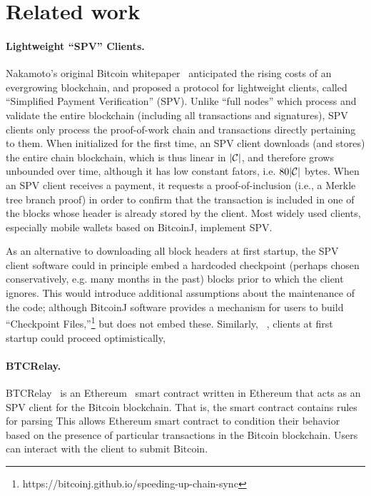 \section{Related work}

\paragraph{Lightweight ``SPV'' Clients.}
Nakamoto's original Bitcoin whitepaper~\cite{bitcoin} anticipated the rising costs of an evergrowing blockchain, and proposed a protocol for lightweight clients, called ``Simplified Payment Verification'' (SPV). Unlike ``full nodes'' which process and validate the entire blockchain (including all transactions and signatures), SPV clients only process the proof-of-work chain and transactions directly pertaining to them.
When initialized for the first time, an SPV client downloads (and stores) the entire chain blockchain, which is thus linear in $|\mathcal{C}|$, and therefore grows unbounded over time, although it has low constant fators, i.e.
$80|\mathcal{C}|$ bytes.
When an SPV client receives a payment, it requests a proof-of-inclusion (i.e., a Merkle tree branch proof) in order to confirm that the transaction is included in one of the blocks whose header is already stored by the client.
Most widely used clients, especially mobile wallets based on BitcoinJ, implement SPV.


As an alternative to downloading all block headers at first startup, the SPV client software could in principle embed a hardcoded checkpoint (perhaps chosen conservatively, e.g. many months in the past) blocks prior to which the client ignores. This would introduce additional assumptions about the maintenance of the code; although BitcoinJ software provides a mechanism for users to build ``Checkpoint Files,''\footnote{https://bitcoinj.github.io/speeding-up-chain-sync} but does not embed these. Similarly, ~\cite{betterspv}, clients at first startup could proceed optimistically,

\paragraph{BTCRelay.}
BTCRelay~\cite{btcrelay} is an Ethereum~\cite{ethereum} smart contract written in Ethereum that acts as an SPV client for the Bitcoin blockchain.
That is, the smart contract contains rules for parsing 
This allows Ethereum smart contract to condition their behavior based on the presence of particular transactions in the Bitcoin blockchain.
Users can interact with the client to submit Bitcoin.

